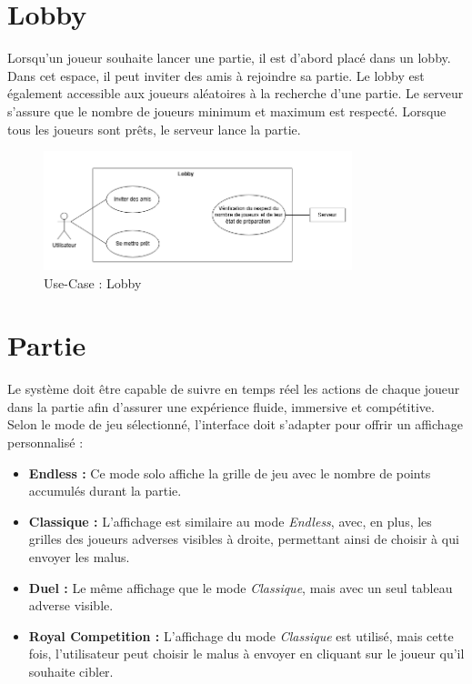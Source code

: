 \documentclass{report}
\begin{document}
\section{Lobby}

\noindent Lorsqu'un joueur souhaite lancer une partie, il est d'abord placé dans un lobby. Dans cet espace, il peut inviter des amis à rejoindre sa partie. Le lobby est également accessible aux joueurs aléatoires à la recherche d'une partie. Le serveur s'assure que le nombre de joueurs minimum et maximum est respecté. Lorsque tous les joueurs sont prêts, le serveur lance la partie.

\vspace{-1em}

\begin{figure}[H]
    \centering
     \includegraphics[width=0.8\textwidth, keepaspectratio]{src/sys_req/lobby.png}
    \caption{Use-Case : Lobby}
    \label{fig:use_case_lobby_sys_req}
\end{figure}

\section{Partie}

\noindent Le système doit être capable de suivre en temps réel les actions de chaque joueur dans la partie afin d'assurer une expérience fluide, immersive et compétitive. Selon le mode de jeu sélectionné, l'interface doit s'adapter pour offrir un affichage personnalisé :

\begin{itemize}
    \item \textbf{Endless :} Ce mode solo affiche la grille de jeu avec le nombre de points accumulés durant la partie.
    \item \textbf{Classique :} L'affichage est similaire au mode \emph{Endless}, avec, en plus, les grilles des joueurs adverses visibles à droite, permettant ainsi de choisir à qui envoyer les malus.
    \item \textbf{Duel :} Le même affichage que le mode \emph{Classique}, mais avec un seul tableau adverse visible.
    \item \textbf{Royal Competition :} L'affichage du mode \emph{Classique} est utilisé, mais cette fois, l'utilisateur peut choisir le malus à envoyer en cliquant sur le joueur qu'il souhaite cibler.
\end{itemize}
\end{document}

